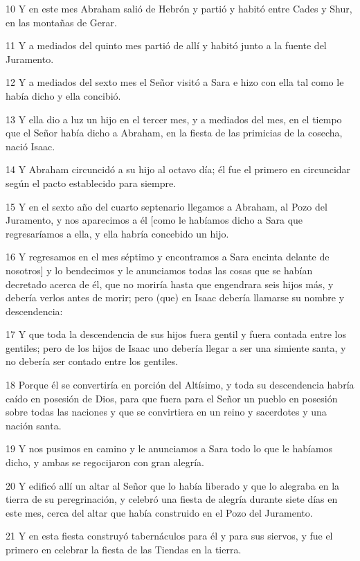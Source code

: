 \par 10 Y en este mes Abraham salió de Hebrón y partió y habitó entre Cades y Shur, en las montañas de Gerar.
\par 11 Y a mediados del quinto mes partió de allí y habitó junto a la fuente del Juramento.
\par 12 Y a mediados del sexto mes el Señor visitó a Sara e hizo con ella tal como le había dicho y ella concibió.
\par 13 Y ella dio a luz un hijo en el tercer mes, y a mediados del mes, en el tiempo que el Señor había dicho a Abraham, en la fiesta de las primicias de la cosecha, nació Isaac.
\par 14 Y Abraham circuncidó a su hijo al octavo día; él fue el primero en circuncidar según el pacto establecido para siempre.
\par 15 Y en el sexto año del cuarto septenario llegamos a Abraham, al Pozo del Juramento, y nos aparecimos a él [como le habíamos dicho a Sara que regresaríamos a ella, y ella habría concebido un hijo.
\par 16 Y regresamos en el mes séptimo y encontramos a Sara encinta delante de nosotros] y lo bendecimos y le anunciamos todas las cosas que se habían decretado acerca de él, que no moriría hasta que engendrara seis hijos más, y debería verlos antes de morir; pero (que) en Isaac debería llamarse su nombre y descendencia:
\par 17 Y que toda la descendencia de sus hijos fuera gentil y fuera contada entre los gentiles; pero de los hijos de Isaac uno debería llegar a ser una simiente santa, y no debería ser contado entre los gentiles.
\par 18 Porque él se convertiría en porción del Altísimo, y toda su descendencia habría caído en posesión de Dios, para que fuera para el Señor un pueblo en posesión sobre todas las naciones y que se convirtiera en un reino y sacerdotes y una nación santa.
\par 19 Y nos pusimos en camino y le anunciamos a Sara todo lo que le habíamos dicho, y ambas se regocijaron con gran alegría.
\par 20 Y edificó allí un altar al Señor que lo había liberado y que lo alegraba en la tierra de su peregrinación, y celebró una fiesta de alegría durante siete días en este mes, cerca del altar que había construido en el Pozo del Juramento.
\par 21 Y en esta fiesta construyó tabernáculos para él y para sus siervos, y fue el primero en celebrar la fiesta de las Tiendas en la tierra.
